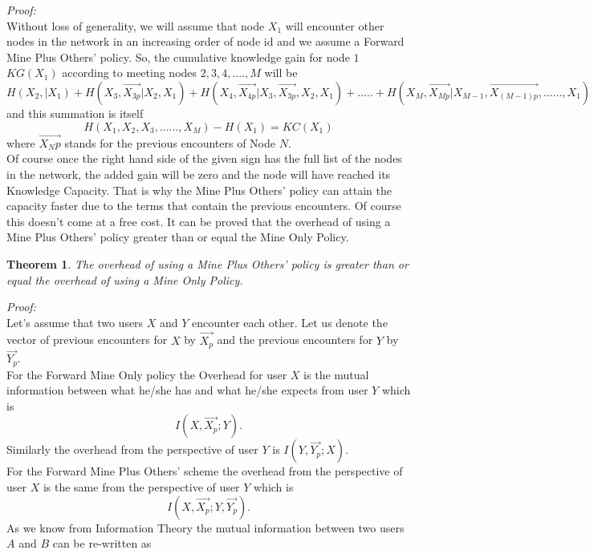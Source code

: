 \documentclass[11pt]{article}
\newtheorem{theorem}{Theorem}
\begin{document}
\begin{itemize}
\textit{Proof:}\\
Without loss of generality, we will assume that node $X_1$ will encounter other nodes in the network in an increasing order of node id and we assume a Forward Mine Plus Others' policy. So, the cumulative knowledge gain for node $1$ $KG(X_1)$ according to meeting nodes $2, 3, 4,...., M$ will be $H(X_2,|X_1) + H(X_3, \vec{X_{3p}}|X_2,X_1) + H(X_4, \vec{X_{4p}}|X_3, \vec{X_{3p}}, X_2,X_1)+.....+ H(X_M, \vec{X_{Mp}}|X_{M-1}, \vec{X_{(M-1)p}} ,......, X_1)$ and this summation is itself $$H(X_1, X_2, X_3, ......, X_M) - H(X_1)= KC(X_1)$$ where $\vec{X_Np}$ stands for the previous encounters of Node $N$.\\
Of course once the right hand side of the given sign has the full list of the nodes in the network, the added gain will be zero and the node will have reached its Knowledge Capacity. That is why the Mine Plus Others' policy can attain the capacity faster due to the terms that contain the previous encounters. Of course this doesn't come at a free cost. It can be proved that the overhead of using a Mine Plus Others' policy greater than or equal the Mine Only Policy.\\
\begin{theorem}
The overhead of using a Mine Plus Others' policy is greater than or equal the overhead of using a Mine Only Policy.
\end{theorem}
\textit{Proof:}\\
Let's assume that two users $X$ and $Y$ encounter each other. Let us denote the vector of previous encounters for $X$ by $\vec{X_p}$ and the previous encounters for $Y$ by $\vec{Y_p}$.\\
For the Forward Mine Only policy the Overhead for user $X$ is the mutual information between what he/she has and what he/she expects from user $Y$ which is 
\begin{equation}
I(X,\vec{X_p};Y).
\label{overheadX}
\end{equation}
Similarly the overhead from the perspective of user $Y$ is $I(Y,\vec{Y_p};X)$.\\
For the Forward Mine Plus Others' scheme the overhead from the perspective of user $X$ is the same from the perspective of user $Y$ which is
\begin{equation} 
I(X,\vec{X_p};Y, \vec{Y_p}).
\label{overheadXY}
\end{equation}
As we know from Information Theory the mutual information between two users $A$ and $B$ can be re-written as

\end{itemize}
\end{document}
